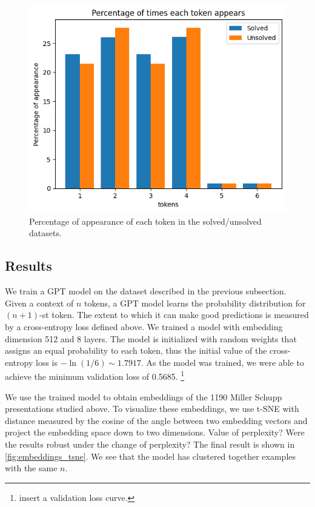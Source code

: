 \begin{figure}
	\centering
	\includegraphics[scale=0.6]{fig/tokens_hist.png}
	\caption{Percentage of appearance of each token in the solved/unsolved datasets.}
	\label{fig:tokens_hist}
\end{figure}

\subsection{Results}
We train a GPT model on the dataset described in the previous subsection.
Given a context of $n$ tokens, a GPT model learns the probability distribution for $(n+1)$-st token.
The extent to which it can make good predictions is measured by a cross-entropy loss defined above.
We trained a model with embedding dimension 512 and 8 layers.
The model is initialized with random weights that assigns an equal probability to each token, thus the initial value of the cross-entropy loss is $-\ln(1/6) \sim 1.7917$.
As the model was trained, we were able to achieve the minimum validation loss of 0.5685.
\footnote{insert a validation loss curve.}

We use the trained model to obtain embeddings of the 1190 Miller Schupp presentations studied above.
To visualize these embeddings, we use t-SNE with distance measured by the cosine of the angle between two embedding vectors and project the embedding space down to two dimensions.   Value of perplexity? Were the results robust under the change of perplexity?
The final result is shown in \autoref{fig:embeddings_tsne}.
We see that the model has clustered together examples with the same $n$.


